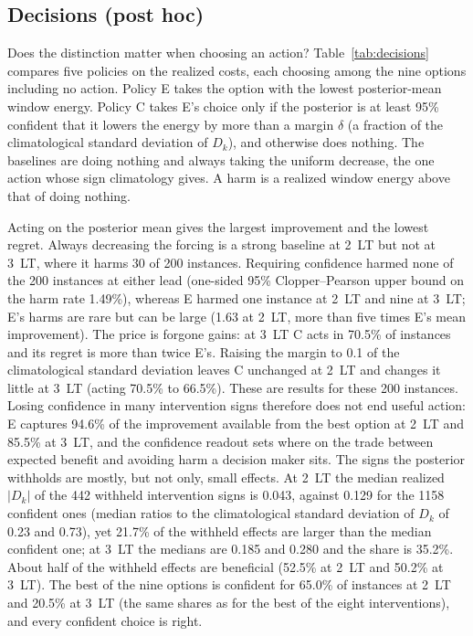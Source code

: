 \documentclass[11pt]{article}
\begin{document}
\subsection{Decisions (post hoc)}
\label{sec:decisions}
Does the distinction matter when choosing an action? Table~\ref{tab:decisions} compares five policies on the realized costs, each choosing among the nine options including no action. Policy E takes the option with the lowest posterior-mean window energy. Policy C takes E's choice only if the posterior is at least 95\% confident that it lowers the energy by more than a margin $\delta$ (a fraction of the climatological standard deviation of $D_k$), and otherwise does nothing. The baselines are doing nothing and always taking the uniform decrease, the one action whose sign climatology gives. A harm is a realized window energy above that of doing nothing.

Acting on the posterior mean gives the largest improvement and the lowest regret. Always decreasing the forcing is a strong baseline at 2~LT but not at 3~LT, where it harms 30 of 200 instances. Requiring confidence harmed none of the 200 instances at either lead (one-sided 95\% Clopper--Pearson upper bound on the harm rate 1.49\%), whereas E harmed one instance at 2~LT and nine at 3~LT; E's harms are rare but can be large (1.63 at 2~LT, more than five times E's mean improvement). The price is forgone gains: at 3~LT C acts in 70.5\% of instances and its regret is more than twice E's. Raising the margin to 0.1 of the climatological standard deviation leaves C unchanged at 2~LT and changes it little at 3~LT (acting 70.5\% to 66.5\%). These are results for these 200 instances. Losing confidence in many intervention signs therefore does not end useful action: E captures 94.6\% of the improvement available from the best option at 2~LT and 85.5\% at 3~LT, and the confidence readout sets where on the trade between expected benefit and avoiding harm a decision maker sits. The signs the posterior withholds are mostly, but not only, small effects. At 2~LT the median realized $|D_k|$ of the 442 withheld intervention signs is 0.043, against 0.129 for the 1158 confident ones (median ratios to the climatological standard deviation of $D_k$ of 0.23 and 0.73), yet 21.7\% of the withheld effects are larger than the median confident one; at 3~LT the medians are 0.185 and 0.280 and the share is 35.2\%. About half of the withheld effects are beneficial (52.5\% at 2~LT and 50.2\% at 3~LT). The best of the nine options is confident for 65.0\% of instances at 2~LT and 20.5\% at 3~LT (the same shares as for the best of the eight interventions), and every confident choice is right.
\end{document}
